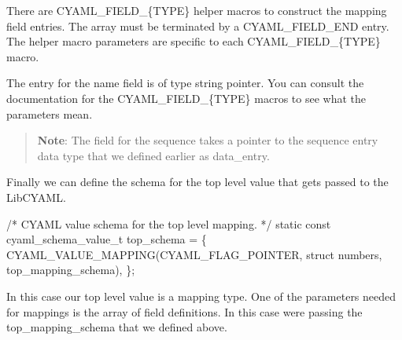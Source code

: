 There are {\ttfamily C\+Y\+A\+M\+L\+\_\+\+F\+I\+E\+L\+D\+\_\+\{T\+Y\+PE\}} helper macros to construct the mapping field entries. The array must be terminated by a {\ttfamily C\+Y\+A\+M\+L\+\_\+\+F\+I\+E\+L\+D\+\_\+\+E\+ND} entry. The helper macro parameters are specific to each {\ttfamily C\+Y\+A\+M\+L\+\_\+\+F\+I\+E\+L\+D\+\_\+\{T\+Y\+PE\}} macro.

The entry for the name field is of type string pointer. You can consult the documentation for the {\ttfamily C\+Y\+A\+M\+L\+\_\+\+F\+I\+E\+L\+D\+\_\+\{T\+Y\+PE\}} macros to see what the parameters mean.

\begin{quote}
{\bfseries Note}\+: The field for the sequence takes a pointer to the sequence entry data type that we defined earlier as {\ttfamily data\+\_\+entry}. \end{quote}


Finally we can define the schema for the top level value that gets passed to the Lib\+C\+Y\+A\+ML.


\begin{DoxyCode}
\textcolor{comment}{/* CYAML value schema for the top level mapping. */}
\textcolor{keyword}{static} \textcolor{keyword}{const} cyaml\_schema\_value\_t top\_schema = \{
    CYAML\_VALUE\_MAPPING(CYAML\_FLAG\_POINTER,
            \textcolor{keyword}{struct} numbers, top\_mapping\_schema),
\};
\end{DoxyCode}


In this case our top level value is a mapping type. One of the parameters needed for mappings is the array of field definitions. In this case we\textquotesingle{}re passing the {\ttfamily top\+\_\+mapping\+\_\+schema} that we defined above.


